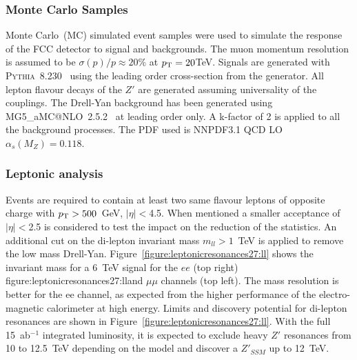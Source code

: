 \subsubsection{Monte Carlo Samples}
\label{subsection:MC}
Monte Carlo~(MC) simulated event samples were used to simulate the response of the FCC detector to signal and backgrounds. The muon momentum resolution 
is assumed to be $\sigma(p)/p \approx 20\%$ at $p_{\text{T}}= 20 $TeV. Signals are generated with {\scshape Pythia}~8.230~\cite{Sjostrand:2014zea} using the leading 
order cross-section from the generator. All lepton flavour decays of the $Z'$ are generated assuming universality of the couplings.
The Drell-Yan background has been generated using {\scshape MG5\_}a{\scshape MC@NLO}~2.5.2~\cite{Alwall:2014hca} at leading order only. 
A k-factor of 2 is applied to all the background processes. The PDF used is NNPDF3.1 QCD LO $\alpha_{s}(M_Z) = 0.118$.



\subsubsection{Leptonic analysis}
\label{subsection:lepana}

Events are required to contain at least two same flavour leptons of opposite charge with $p_{\text{T}} > 500$~GeV, $|\eta|<$4.5. 
When mentioned a smaller acceptance of $|\eta|<$2.5 is considered to test the impact on the reduction of the statistics. 
An additional cut on the di-lepton invariant mass $m_{ll}>1$~TeV is applied to remove the low mass Drell-Yan. 
Figure~\ref{figure:leptonicresonances27:ll} shows the invariant mass for a 6~TeV signal for the $ee$ (top right) figure:leptonicresonances27:lland $\mu\mu$ channels (top left). 
The mass resolution is better for the ee channel, as expected from the higher performance of the electro-magnetic calorimeter at high energy.
\newline
%
Limits and discovery potential for di-lepton resonances are shown in Figure~\ref{figure:leptonicresonances27:ll}. With the full 15~ab$^{-1}$ 
integrated luminosity, it is expected to exclude heavy $Z'$ resonances from 10 to 12.5~TeV depending on the model and discover 
a $Z'_{SSM}$ up to 12~TeV.

